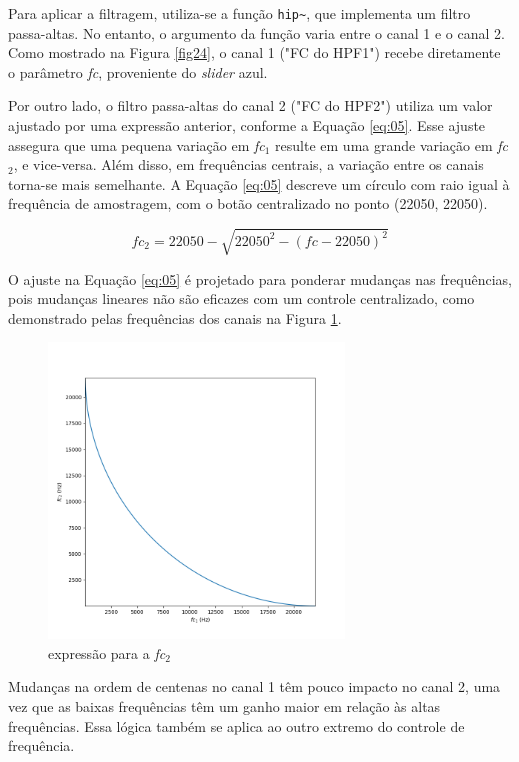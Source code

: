 Para aplicar a filtragem, utiliza-se a função \texttt{hip\textasciitilde}, que implementa um filtro passa-altas. No entanto, o argumento da função varia entre o canal 1 e o canal 2. Como mostrado na Figura \ref{fig24}, o canal 1 ("FC do HPF1") recebe diretamente o parâmetro \textit{fc}, proveniente do \textit{slider} azul.

Por outro lado, o filtro passa-altas do canal 2 ("FC do HPF2") utiliza um valor ajustado por uma expressão anterior, conforme a Equação \ref{eq:05}. Esse ajuste assegura que uma pequena variação em \textit{fc$_{1}$} resulte em uma grande variação em \textit{fc$_{2}$}, e vice-versa. Além disso, em frequências centrais, a variação entre os canais torna-se mais semelhante. A Equação \ref{eq:05} descreve um círculo com raio igual à frequência de amostragem, com o botão centralizado no ponto (22050, 22050).

\begin{equation}  \label{eq:05}
    fc_2 = 22050 - \sqrt{22050^2 - (fc - 22050)^2}
\end{equation}

O ajuste na Equação \ref{eq:05} é projetado para ponderar mudanças nas frequências, pois mudanças lineares não são eficazes com um controle centralizado, como demonstrado pelas frequências dos canais na Figura \ref{fig45}.

\begin{figure}[h]
    \centering
    \includegraphics[width=0.7\textwidth]{figuras/fig45.png}
    \caption{expressão para a \textit{fc$_{2}$}}
    \label{fig45}
\end{figure}

Mudanças na ordem de centenas no canal 1 têm pouco impacto no canal 2, uma vez que as baixas frequências têm um ganho maior em relação às altas frequências. Essa lógica também se aplica ao outro extremo do controle de frequência.

